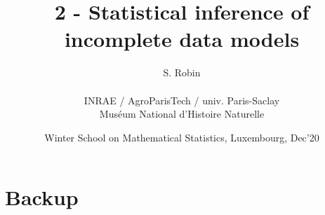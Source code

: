 \documentclass[8pt]{beamer}
\newcommand{\figlux}{./Figures}
\begin{document}
\title{2 - Statistical inference of incomplete data models}

\author[S. Robin]{S. Robin \\ ~\\
  {\small INRAE / AgroParisTech / univ. Paris-Saclay \\
  Mus\'eum National d'Histoire Naturelle}
  }

\date[Luxembourg, Dec'20]{Winter School on Mathematical Statistics, Luxembourg, Dec'20}

\maketitle











\backupbegin 
\section*{Backup}



\backupend 

\end{document}
